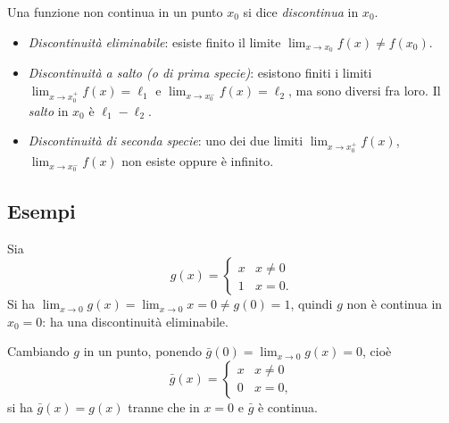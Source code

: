 \documentclass[11pt,a4paper]{article}
\begin{document}
Una funzione non continua in un punto $x_0$ si dice \emph{discontinua} in $x_0$.

\begin{definizione}
\begin{itemize}
    \item \emph{Discontinuità eliminabile}: esiste finito il limite $\displaystyle\lim_{x\to x_0} f(x) \neq f(x_0)$.
    \item \emph{Discontinuità a salto (o di prima specie)}: esistono finiti i limiti $\displaystyle\lim_{x\to x_0^+} f(x) = \ell_1$ e $\displaystyle\lim_{x\to x_0^-} f(x) = \ell_2$, ma sono diversi fra loro. Il \emph{salto} in $x_0$ è $\ell_1 - \ell_2$.
    \item \emph{Discontinuità di seconda specie}: uno dei due limiti $\displaystyle\lim_{x\to x_0^+} f(x)$, $\displaystyle\lim_{x\to x_0^-} f(x)$ non esiste oppure è infinito.
\end{itemize}
\end{definizione}

\subsection{Esempi}

\begin{esempio}
Sia
\[
g(x) = \begin{cases} x & x \neq 0 \\ 1 & x = 0 .\end{cases}
\]
Si ha $\displaystyle\lim_{x\to 0} g(x) = \lim_{x\to 0} x = 0 \neq g(0) = 1$, quindi $g$ non è continua in $x_0 = 0$: ha una discontinuità eliminabile.

Cambiando $g$ in un punto, ponendo $\bar g(0) = \lim_{x\to 0} g(x) = 0$, cioè
\[
\bar g(x) = \begin{cases} x & x \neq 0 \\ 0 & x = 0 ,\end{cases}
\]
si ha $\bar g(x) = g(x)$ tranne che in $x = 0$ e $\bar g$ è continua.
\end{esempio}
\end{document}
